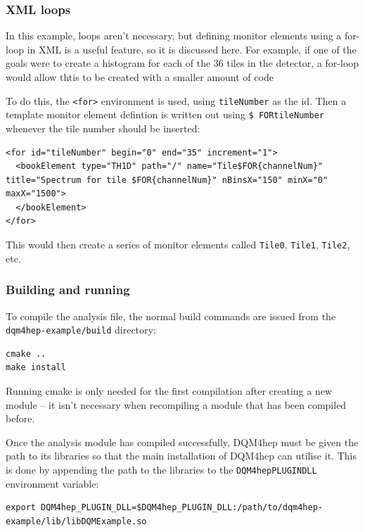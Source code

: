 \subsubsection{XML loops}
In this example, loops aren't necessary, but defining monitor elements using a for-loop in \acrshort{XML} is a useful feature, so it is discussed here. For example, if one of the goals were to create a histogram for each of the 36 tiles in the detector, a for-loop would allow thtis to be created with a smaller amount of code

To do this, the \texttt{<for>} environment is used, using \texttt{tileNumber} as the id. Then a template monitor element defintion is written out using \texttt{\$ FOR{tileNumber}} whenever the tile number should be inserted:

\begin{lstlisting}
<for id="tileNumber" begin="0" end="35" increment="1">
  <bookElement type="TH1D" path="/" name="Tile$FOR{channelNum}" title="Spectrum for tile $FOR{channelNum}" nBinsX="150" minX="0" maxX="1500">
  </bookElement>
</for>
\end{lstlisting}

This would then create a series of monitor elements called \texttt{Tile0}, \texttt{Tile1}, \texttt{Tile2}, etc.

\subsubsection{Building and running}
To compile the analysis file, the normal build commands are issued from the \texttt{dqm4hep-example/build} directory:

\begin{lstlisting}
cmake ..
make install
\end{lstlisting}

Running cmake is only needed for the first compilation after creating a new module – it isn't necessary when recompiling a module that has been compiled before.

Once the analysis module has compiled successfully, \acrshort{DQM4hep} must be given the path to its libraries so that the main installation of \acrshort{DQM4hep} can utilise it. This is done by appending the path to the libraries to the \texttt{DQM4hep\textunderscore PLUGIN\textunderscore DLL} environment variable:

\begin{lstlisting}
export DQM4hep_PLUGIN_DLL=$DQM4hep_PLUGIN_DLL:/path/to/dqm4hep-example/lib/libDQMExample.so
\end{lstlisting}

